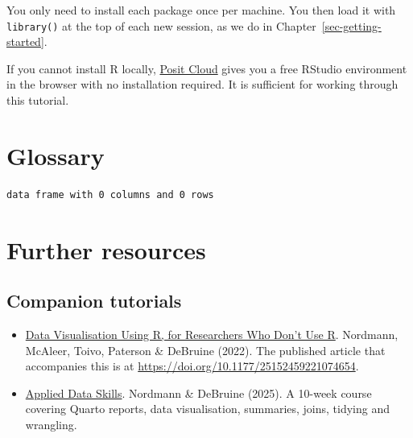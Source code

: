 \documentclass[
  english,
  letterpaper,
]{book}
\providecommand{\tightlist}{%
  \setlength{\itemsep}{0pt}\setlength{\parskip}{0pt}}
\begin{document}
You only need to install each package once per machine. You then load it
with \texttt{library()} at the top of each new session, as we do in
Chapter~\ref{sec-getting-started}.

\begin{tcolorbox}[enhanced jigsaw, colframe=quarto-callout-tip-color-frame, breakable, left=2mm, leftrule=.75mm, toptitle=1mm, rightrule=.15mm, opacitybacktitle=0.6, arc=.35mm, colback=white, title=\textcolor{quarto-callout-tip-color}{\faLightbulb}\hspace{0.5em}{Tip}, coltitle=black, colbacktitle=quarto-callout-tip-color!10!white, toprule=.15mm, bottomtitle=1mm, opacityback=0, titlerule=0mm, bottomrule=.15mm]

If you cannot install R locally, \href{https://posit.cloud/}{Posit
Cloud} gives you a free RStudio environment in the browser with no
installation required. It is sufficient for working through this
tutorial.

\end{tcolorbox}

\chapter{Glossary}\label{sec-glossary}

\begin{verbatim}
data frame with 0 columns and 0 rows
\end{verbatim}

\chapter{Further resources}\label{sec-resources}

\section{Companion tutorials}\label{companion-tutorials}

\begin{itemize}
\tightlist
\item
  \href{https://psyteachr.github.io/introdataviz/}{Data Visualisation
  Using R, for Researchers Who Don't Use R}. Nordmann, McAleer, Toivo,
  Paterson \& DeBruine (2022). The published article that accompanies
  this is at \url{https://doi.org/10.1177/25152459221074654}.
\item
  \href{https://psyteachr.github.io/ads-v3/}{Applied Data Skills}.
  Nordmann \& DeBruine (2025). A 10-week course covering Quarto reports,
  data visualisation, summaries, joins, tidying and wrangling.
\end{itemize}
\end{document}
